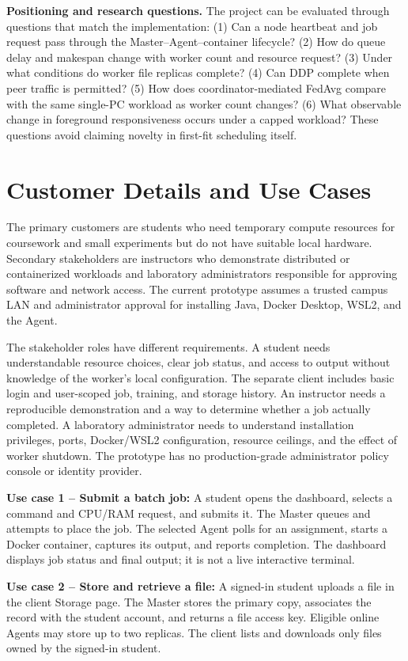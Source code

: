 \documentclass{article}
\begin{document}
\textbf{Positioning and research questions.} The project can be evaluated through questions that match the implementation: (1) Can a node heartbeat and job request pass through the Master--Agent--container lifecycle? (2) How do queue delay and makespan change with worker count and resource request? (3) Under what conditions do worker file replicas complete? (4) Can DDP complete when peer traffic is permitted? (5) How does coordinator-mediated FedAvg compare with the same single-PC workload as worker count changes? (6) What observable change in foreground responsiveness occurs under a capped workload? These questions avoid claiming novelty in first-fit scheduling itself.
    \pagebreak
    \section{Customer Details and Use Cases}
The primary customers are students who need temporary compute resources for coursework and small experiments but do not have suitable local hardware. Secondary stakeholders are instructors who demonstrate distributed or containerized workloads and laboratory administrators responsible for approving software and network access. The current prototype assumes a trusted campus LAN and administrator approval for installing Java, Docker Desktop, WSL2, and the Agent.

The stakeholder roles have different requirements. A student needs understandable resource choices, clear job status, and access to output without knowledge of the worker's local configuration. The separate client includes basic login and user-scoped job, training, and storage history. An instructor needs a reproducible demonstration and a way to determine whether a job actually completed. A laboratory administrator needs to understand installation privileges, ports, Docker/WSL2 configuration, resource ceilings, and the effect of worker shutdown. The prototype has no production-grade administrator policy console or identity provider.

\textbf{Use case 1 -- Submit a batch job:} A student opens the dashboard, selects a command and CPU/RAM request, and submits it. The Master queues and attempts to place the job. The selected Agent polls for an assignment, starts a Docker container, captures its output, and reports completion. The dashboard displays job status and final output; it is not a live interactive terminal.

\textbf{Use case 2 -- Store and retrieve a file:} A signed-in student uploads a file in the client Storage page. The Master stores the primary copy, associates the record with the student account, and returns a file access key. Eligible online Agents may store up to two replicas. The client lists and downloads only files owned by the signed-in student.
\end{document}
